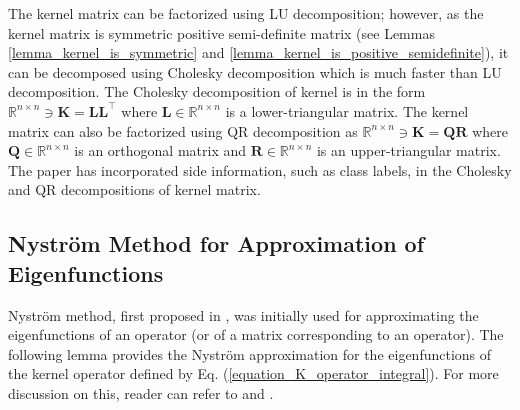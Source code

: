 \documentclass[lang=cn,10pt]{gorgeousnbook}
\numberwithin{equation}{section}%
\numberwithin{figure}{section}%
\begin{document}
The kernel matrix can be factorized using LU decomposition; however, as the kernel matrix is symmetric positive semi-definite matrix (see Lemmas \ref{lemma_kernel_is_symmetric} and \ref{lemma_kernel_is_positive_semidefinite}), it can be decomposed using Cholesky decomposition which is much faster than LU decomposition. The Cholesky decomposition of kernel is in the form $\mathbb{R}^{n \times n} \ni \boldsymbol{K} = \boldsymbol{L} \boldsymbol{L}^\top$ where $\boldsymbol{L} \in \mathbb{R}^{n \times n}$ is a lower-triangular matrix. 
The kernel matrix can also be factorized using QR decomposition as $\mathbb{R}^{n \times n} \ni \boldsymbol{K} = \boldsymbol{Q} \boldsymbol{R}$ where $\boldsymbol{Q} \in \mathbb{R}^{n \times n}$ is an orthogonal matrix and $\boldsymbol{R} \in \mathbb{R}^{n \times n}$ is an upper-triangular matrix. 
The paper \cite{bach2005predictive} has incorporated side information, such as class labels, in the Cholesky and QR decompositions of kernel matrix. 



\subsection{Nystr{\"o}m Method for Approximation of Eigenfunctions}


Nystr{\"o}m method, first proposed in \cite{nystrom1930praktische}, was initially used for approximating the eigenfunctions of an operator (or of a matrix corresponding to an operator). 
The following lemma provides the Nystr{\"o}m approximation for the eigenfunctions of the kernel operator defined by Eq. (\ref{equation_K_operator_integral}).
For more discussion on this, reader can refer to \cite{baker1977numerical} and \cite{williams2000effect}.
\end{document}
